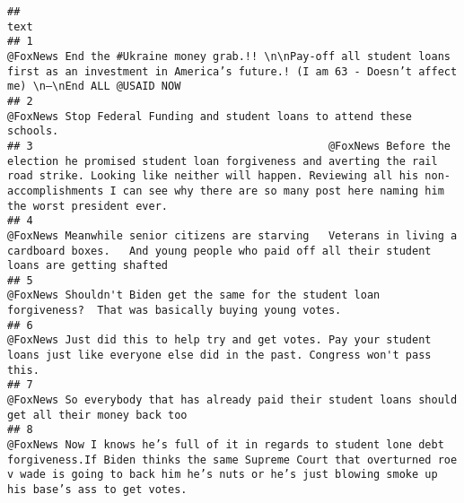 \documentclass[
]{article}
\begin{document}
\begin{verbatim}
##                                                                                                                                                                                                                                                                                                       text
## 1                                                                                                                                 @FoxNews End the #Ukraine money grab.!! \n\nPay-off all student loans first as an investment in America’s future.! (I am 63 - Doesn’t affect me) \n—\nEnd ALL @USAID NOW
## 2                                                                                                                                                                                                                                 @FoxNews Stop Federal Funding and student loans to attend these schools.
## 3                                              @FoxNews Before the election he promised student loan forgiveness and averting the rail road strike. Looking like neither will happen. Reviewing all his non-accomplishments I can see why there are so many post here naming him the worst president ever.
## 4                                                                                                                                      @FoxNews Meanwhile senior citizens are starving   Veterans in living a cardboard boxes.   And young people who paid off all their student loans are getting shafted
## 5                                                                                                                                                                                          @FoxNews Shouldn't Biden get the same for the student loan forgiveness?  That was basically buying young votes.
## 6                                                                                                                                                              @FoxNews Just did this to help try and get votes. Pay your student loans just like everyone else did in the past. Congress won't pass this.
## 7                                                                                                                                                                                                      @FoxNews So everybody that has already paid their student loans should get all their money back too
## 8                                                             @FoxNews Now I knows he’s full of it in regards to student lone debt forgiveness.If Biden thinks the same Supreme Court that overturned roe v wade is going to back him he’s nuts or he’s just blowing smoke up his base’s ass to get votes.

\end{verbatim}
\end{document}
